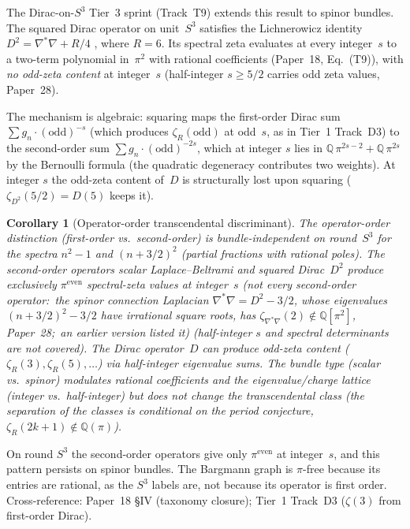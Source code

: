 \documentclass[twocolumn,pra,amsmath,amssymb,superscriptaddress]{revtex4-2}
\newtheorem{corollary}{Corollary}
\begin{document}
The Dirac-on-$S^3$ Tier~3 sprint (Track~T9) extends this result to
spinor bundles.  The squared Dirac operator on unit~$S^3$ satisfies
the Lichnerowicz identity $D^2 = \nabla^*\nabla + R/4$
\cite{lichnerowicz1963}, where $R = 6$.  Its spectral zeta evaluates
at every integer~$s$ to a two-term polynomial in~$\pi^2$ with
rational coefficients (Paper~18, Eq.~(T9)), with
\emph{no odd-zeta content} at integer~$s$ (half-integer $s \ge 5/2$
carries odd zeta values, Paper~28).

The mechanism is algebraic: squaring maps the first-order Dirac
sum $\sum g_n \cdot (\text{odd})^{-s}$ (which produces
$\zeta_R(\text{odd})$ at odd~$s$, as in Tier~1 Track~D3) to the
second-order sum $\sum g_n \cdot (\text{odd})^{-2s}$, which at integer
$s$ lies in $\mathbb{Q}\,\pi^{2s-2} + \mathbb{Q}\,\pi^{2s}$ by the
Bernoulli formula (the quadratic degeneracy contributes two weights).  At
integer $s$ the odd-zeta content of~$D$ is structurally lost upon
squaring ($\zeta_{D^2}(5/2) = D(5)$ keeps it).

\begin{corollary}[Operator-order transcendental discriminant]
The operator-order distinction (first-order vs.\ second-order) is
bundle-independent on round~$S^3$ for the spectra $n^2 - 1$ and
$(n+3/2)^2$ (partial fractions with rational poles).  The
second-order operators scalar Laplace--Beltrami and squared Dirac~$D^2$
produce exclusively $\pi^{\mathrm{even}}$ spectral-zeta values at
integer~$s$ (not every second-order operator:\ the spinor connection
Laplacian $\nabla^*\nabla = D^2 - 3/2$, whose eigenvalues
$(n+3/2)^2 - 3/2$ have irrational square roots, has
$\zeta_{\nabla^*\nabla}(2) \notin \mathbb{Q}[\pi^2]$, Paper~28;\ an earlier
version listed it) (half-integer $s$ and spectral
determinants are not covered).  The Dirac operator~$D$ can
produce odd-zeta content ($\zeta_R(3), \zeta_R(5), \ldots$) via
half-integer eigenvalue sums.  The bundle type (scalar vs.\ spinor)
modulates rational coefficients and the eigenvalue/charge lattice
(integer vs.\ half-integer) but does not change the transcendental
class (the separation of the classes is conditional on the period
conjecture, $\zeta_R(2k{+}1) \notin \mathbb{Q}(\pi)$).
\end{corollary}

On round $S^3$ the second-order operators give only
$\pi^{\mathrm{even}}$ at integer~$s$, and this pattern persists on
spinor bundles.  The Bargmann graph is $\pi$-free because its entries
are rational, as the $S^3$ labels are, not because its operator is
first order.
Cross-reference: Paper~18 \S IV (taxonomy closure);
Tier~1 Track~D3 ($\zeta(3)$ from first-order Dirac).
\end{document}
